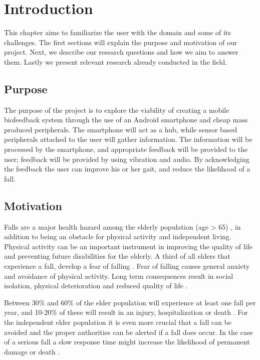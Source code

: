 \chapter{Introduction}
This chapter aims to familiarize the user with the domain and some of its challenges. The first sections will explain the purpose and motivation of our project. Next, we describe our research questions and how we aim to answer them.  Lastly we present relevant research already conducted in the field.

\section{Purpose}
The purpose of the project is to explore the viability of creating a mobile biofeedback system through the use of an Android smartphone and cheap mass produced peripherals. The smartphone will act as a hub, while sensor based peripherals attached to the user will gather information. The information will be processed by the smartphone, and appropriate feedback will be provided to the user; feedback will be provided by using vibration and audio. By acknowledging the feedback the user can improve his or her gait, and reduce the likelihood of a fall.

\section{Motivation}
Falls are a major health hazard among the elderly population (age \textgreater{} 65) \cite{fallsHealthHazard}, in addition to being an obstacle for physical activity and independent living. Physical activity can be an important instrument in improving the quality of life and preventing future disabilities for the elderly\cite{physicalActivity}. A third of all elders that experience a fall, develop a fear of falling \cite{fearOfFalling}. Fear of falling causes general anxiety and avoidance of physical activity. Long term consequences result in social isolation, physical deterioration and reduced quality of life \cite{physicalAvoidance}.

Between 30\% and 60\% of the elder population will experience at least one fall per year, and 10-20\% of these will result in an injury, hospitalization or death \cite{fallStatistics}. For the independent elder population it is even more crucial that a fall can be avoided and the proper authorities can be alerted if a fall does occur. In the case of a serious fall a slow response time might increase the likelihood of permanent damage or death \cite{personHomeDeath, dangerousFallHome}.



